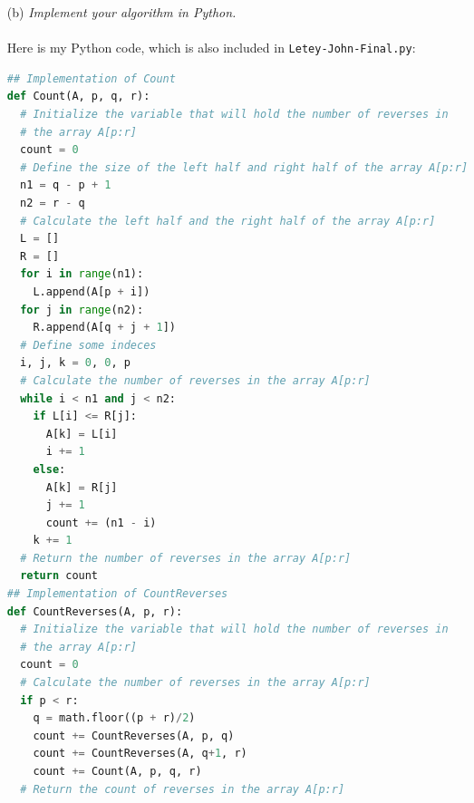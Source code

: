 \documentclass[12pt]{article}
\begin{document}
{\begin{enumerate}
I have to modify the above pseudocode for the function \texttt{Merge-Sort} to be able to return the number of reverses in the array. I will also modify the pseudocode for the Merge procedure. Here is some pseudocode (also taken from the book) for the Merge procedure:
\begin{verbatim}
// The merge procedure
Merge(A, p, q, r)
  1  n1 = q - p + 1
  2  n2 = r - q
  3  let L[1 ... n1+1] and R[1 ... n2+1] be new arrays
  4  for i = 1 to n1
  5      L[i] = A[p + i - 1]
  6  for j = 1 to n2
  7      R[j] = A[q + j]
  8  L[n1 + 1] = infinity
  9  R[n2 + 1] = infinity
 10  i = 1
 11  j = 1
 12  for k = p to r
 13     if L[i] <= R[j]
 14         A[k] = L[i]
 15         i = i + 1
 16     else 
 17         A[k] = R[j]
 18         j = j + 1
\end{verbatim}
The pseudocode for the \texttt{Merge} procedure won't need a lot of changes. All I need to do is add a counter for it to return. I will also be getting rid of lines 8 and 9 of the pseudocode.
\item[(b)]\textsl{Implement your algorithm in Python.}\\ \\
Here is my Python code, which is also included in \texttt{Letey-John-Final.py}:
\begin{lstlisting}[language=Python]
## Implementation of Count
def Count(A, p, q, r):
  # Initialize the variable that will hold the number of reverses in 
  # the array A[p:r]
  count = 0
  # Define the size of the left half and right half of the array A[p:r]
  n1 = q - p + 1
  n2 = r - q
  # Calculate the left half and the right half of the array A[p:r]
  L = []
  R = []
  for i in range(n1):
    L.append(A[p + i])
  for j in range(n2):
    R.append(A[q + j + 1])
  # Define some indeces
  i, j, k = 0, 0, p
  # Calculate the number of reverses in the array A[p:r]
  while i < n1 and j < n2:
    if L[i] <= R[j]:
      A[k] = L[i]
      i += 1
    else:
      A[k] = R[j]
      j += 1
      count += (n1 - i)
    k += 1
  # Return the number of reverses in the array A[p:r]
  return count
## Implementation of CountReverses
def CountReverses(A, p, r):
  # Initialize the variable that will hold the number of reverses in
  # the array A[p:r]
  count = 0
  # Calculate the number of reverses in the array A[p:r]
  if p < r:
    q = math.floor((p + r)/2)
    count += CountReverses(A, p, q)
    count += CountReverses(A, q+1, r)
    count += Count(A, p, q, r)
  # Return the count of reverses in the array A[p:r]

\end{lstlisting}
\end{enumerate}}
\end{document}
